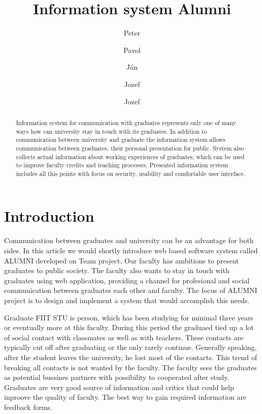 \documentclass{iitsrc}[2006/14/02]
\title{Information system Alumni}
\author{Peter}{C\'ich}
\author{Pavol}{F\'abik}
\author{J\'an}{Garaj}
\author{Jozef}{Hergott}
\author{Jozef}{Hopko}
\begin{document}
\begin{abstract}
Information system for communication with graduates represents only one of many ways how can university stay in touch with its graduates. In addition to communication between university and graduate the information system allows communication between graduates, their personal presentation for public. System also collects actual information about working experiences of graduates, which can be used to improve faculty credits and teaching processes. Presented information system includes all this points with focus on security, usability and comfortable user interface.
\end{abstract}


\section{Introduction}

Communication between graduates and university can be an advantage for both sides. In this article we would shortly introduce web based software system called ALUMNI developed on Team project. Our faculty has ambitions to present graduates to public society. The faculty also wants to stay in touch with graduates using web application, providing a channel for profesional and social communication between graduates each other and faculty. The focus of ALUMNI project is to design and implement a system that would accomplish this needs. 

Graduate FIIT STU is person, which has been studying for minimal three years or eventually more at this faculty. During this period the graduaed tied up a lot of social contact with classmates as well as with teachers. These contacts are typically cut off after graduating or the only rarely continue. Generally speaking, after the student leaves the university, he lost most of the contacts. This trend of breaking all contacts is not wanted by the faculty. The faculty sees the graduates as potential bussines partners with possibility to cooperated after study. Graduates are very good source of information and critics that could help inproove the quality of faculty. The best way to gain required information are feedback forms.

\end{document}
